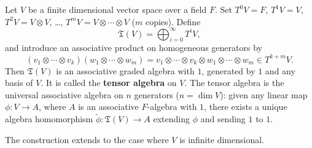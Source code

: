 Let $V$ be a finite dimensional vector space over a field $F$. Set $T^0 V = F$, $T^1 V = V$, $T^2 V = V \otimes V$, \ldots, $T^m V = V \otimes \cdots \otimes V$ ($m$ copies). Define
$$\mathfrak{T}(V) = \bigoplus_{i=0}^{\infty} T^i V,$$
and introduce an associative product on homogeneous generators by
$$(v_1 \otimes \cdots \otimes v_k)(w_1 \otimes \cdots \otimes w_m) = v_1 \otimes \cdots \otimes v_k \otimes w_1 \otimes \cdots \otimes w_m \in T^{k+m} V.$$
Then $\mathfrak{T}(V)$ is an associative graded algebra with $1$, generated by $1$ and any basis of $V$. It is called the \textbf{tensor algebra} on $V$. The tensor algebra is the universal associative algebra on $n$ generators ($n = \dim V$): given any linear map $\phi: V \to A$, where $A$ is an associative $F$-algebra with $1$, there exists a unique algebra homomorphism $\tilde{\phi}: \mathfrak{T}(V) \to A$ extending $\phi$ and sending $1$ to $1$.

The construction extends to the case where $V$ is infinite dimensional.
